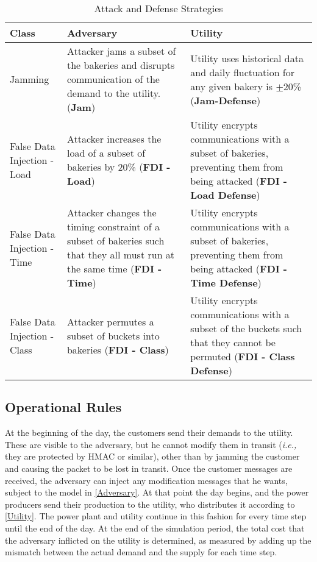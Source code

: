 \documentclass[conference]{IEEEtran}
\newcommand{\ie}{\emph{i.e.,}\xspace}
\begin{document}
\begin{table}[!htbp]
\label{strategies}
\centering
\begin{tabular}{p{2cm} | p{3cm} | p{3cm}}
\toprule
Class & Adversary & Utility\\
\midrule
Jamming & Attacker jams a subset of the bakeries and disrupts communication of the demand to the utility. ({\bf Jam}) & Utility uses historical data and daily fluctuation for any given bakery is $\pm$20\%  ({\bf Jam-Defense})\\
False Data Injection - Load &  Attacker increases the load of a subset of bakeries by 20\% ({\bf FDI - Load}) & Utility encrypts communications with a subset of bakeries, preventing them from being attacked ({\bf FDI - Load Defense}) \\
False Data Injection - Time & Attacker changes the timing constraint of a subset of bakeries such that they all must run at the same time ({\bf FDI - Time}) & Utility encrypts communications with a subset of bakeries, preventing them from being attacked ({\bf FDI - Time Defense})\\
False Data Injection - Class & Attacker permutes a subset of buckets into bakeries ({\bf FDI - Class}) & Utility encrypts communications with a subset of the buckets such that they cannot be permuted ({\bf FDI - Class Defense})\\
\bottomrule
\end{tabular}
\vspace{0.1in}
\caption{Attack and Defense Strategies}
\end{table}

\subsection{Operational Rules}
\label{Rules}

At the beginning of the day, the customers send their demands to the utility. These are visible to the adversary, but he cannot modify them in transit (\ie they are protected by HMAC or similar), other than by jamming the customer and causing the packet to be lost in transit.   Once the customer messages are received, the adversary can inject any modification messages that he wants, subject to the model in \ref{Adversary}. At that point the day begins, and the power producers send their production to the utility, who distributes it according to \ref{Utility}. The power plant and utility continue in this fashion for every time step until the end of the day. At the end of the simulation period, the total cost that the adversary inflicted
on the utility is determined, as measured by adding up the mismatch between the actual demand and the supply for each time step. 
\end{document}
